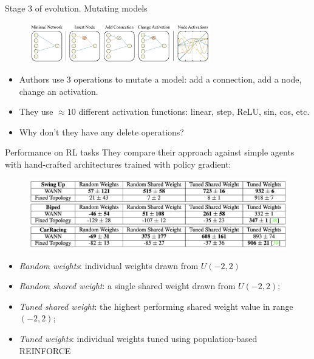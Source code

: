 \documentclass[handout, 10pt]{beamer}
\begin{document}
\begin{frame}{Stage 3 of evolution. Mutating models}
\begin{figure}
    \centering
    \includegraphics[width=0.7\textwidth]{images/wann-possible-mutations.png}
\end{figure}

\begin{itemize}
    \item\pause Authors use 3 operations to mutate a model: add a connection, add a node, change an activation.
    \item\pause They use $\approx 10$ different activation functions: linear, step, ReLU, sin, cos, etc.
    \item\pause Why don't they have any delete operations?
\end{itemize}
\end{frame}


\begin{frame}{Performance on RL tasks}
They compare their approach against simple agents with hand-crafted architectures trained with policy gradient:

\begin{figure}
    \centering
    \includegraphics[width=\textwidth]{images/rl-results.png}
\end{figure}

\begin{itemize}
    \item \textit{Random weights}: individual weights drawn from $U(-2, 2)$
    \item \textit{Random shared weight}: a single shared weight drawn from $U(-2, 2)$;
    \item \textit{Tuned shared weight}: the highest performing shared weight value in range $(-2, 2)$;
    \item \textit{Tuned weights}: individual weights tuned using population-based REINFORCE
\end{itemize}
\end{frame}
\end{document}
